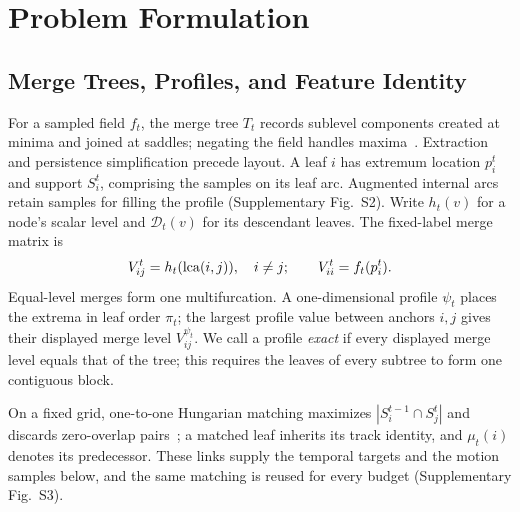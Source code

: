 \section{Problem Formulation}\label{sec:formulation}\label{sec:background}
\subsection{Merge Trees, Profiles, and Feature Identity}
For a sampled field $f_t$, the merge tree $T_t$ records sublevel components created at minima and joined at saddles; negating the field handles maxima~\cite{Tierny:2018:TTK}. Extraction and persistence simplification precede layout. A leaf $i$ has extremum location $p_i^t$ and support $S_i^t$, comprising the samples on its leaf arc. Augmented internal arcs retain samples for filling the profile (Supplementary Fig.~S2). Write $h_t(v)$ for a node's scalar level and $\mathcal{D}_t(v)$ for its descendant leaves. The fixed-label merge matrix is
\begin{equation}\label{eq:merge}
V_{ij}^t=h_t(\operatorname{lca}(i,j)),\quad i\ne j;\qquad V_{ii}^t=f_t(p_i^t).
\end{equation}
Equal-level merges form one multifurcation. A one-dimensional profile $\psi_t$ places the extrema in leaf order $\pi_t$; the largest profile value between anchors $i,j$ gives their displayed merge level $V_{ij}^{\psi_t}$. We call a profile \emph{exact} if every displayed merge level equals that of the tree; this requires the leaves of every subtree to form one contiguous block.

On a fixed grid, one-to-one Hungarian matching maximizes $|S_i^{t-1}\cap S_j^t|$ and discards zero-overlap pairs~\cite{STMTM:2026}; a matched leaf inherits its track identity, and $\mu_t(i)$ denotes its predecessor. These links supply the temporal targets and the motion samples below, and the same matching is reused for every budget (Supplementary Fig.~S3).

